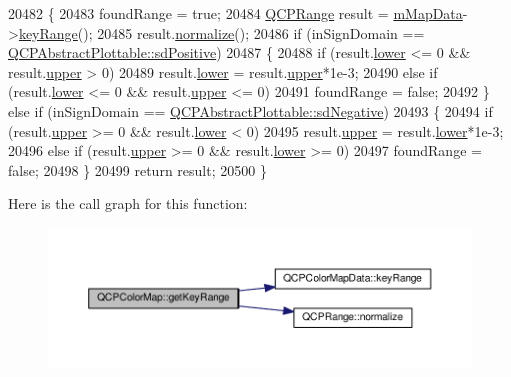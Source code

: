 \begin{DoxyCode}
20482 \{
20483   foundRange = \textcolor{keyword}{true};
20484   \hyperlink{class_q_c_p_range}{QCPRange} result = \hyperlink{class_q_c_p_color_map_a8709272aa8f0be3ca111bf3866806f8b}{mMapData}->\hyperlink{class_q_c_p_color_map_data_a4765180639742460f64ab6c97c745c08}{keyRange}();
20485   result.\hyperlink{class_q_c_p_range_af914a7740269b0604d0827c634a878a9}{normalize}();
20486   \textcolor{keywordflow}{if} (inSignDomain == \hyperlink{class_q_c_p_abstract_plottable_a661743478a1d3c09d28ec2711d7653d8a02951859f243a4d24e779cfbb5471030}{QCPAbstractPlottable::sdPositive})
20487   \{
20488     \textcolor{keywordflow}{if} (result.\hyperlink{class_q_c_p_range_aa3aca3edb14f7ca0c85d912647b91745}{lower} <= 0 && result.\hyperlink{class_q_c_p_range_ae44eb3aafe1d0e2ed34b499b6d2e074f}{upper} > 0)
20489       result.\hyperlink{class_q_c_p_range_aa3aca3edb14f7ca0c85d912647b91745}{lower} = result.\hyperlink{class_q_c_p_range_ae44eb3aafe1d0e2ed34b499b6d2e074f}{upper}*1e-3;
20490     \textcolor{keywordflow}{else} \textcolor{keywordflow}{if} (result.\hyperlink{class_q_c_p_range_aa3aca3edb14f7ca0c85d912647b91745}{lower} <= 0 && result.\hyperlink{class_q_c_p_range_ae44eb3aafe1d0e2ed34b499b6d2e074f}{upper} <= 0)
20491       foundRange = \textcolor{keyword}{false};
20492   \} \textcolor{keywordflow}{else} \textcolor{keywordflow}{if} (inSignDomain == \hyperlink{class_q_c_p_abstract_plottable_a661743478a1d3c09d28ec2711d7653d8a0fc9a70796ef60ad18ddd18056e6dc63}{QCPAbstractPlottable::sdNegative})
20493   \{
20494     \textcolor{keywordflow}{if} (result.\hyperlink{class_q_c_p_range_ae44eb3aafe1d0e2ed34b499b6d2e074f}{upper} >= 0 && result.\hyperlink{class_q_c_p_range_aa3aca3edb14f7ca0c85d912647b91745}{lower} < 0)
20495       result.\hyperlink{class_q_c_p_range_ae44eb3aafe1d0e2ed34b499b6d2e074f}{upper} = result.\hyperlink{class_q_c_p_range_aa3aca3edb14f7ca0c85d912647b91745}{lower}*1e-3;
20496     \textcolor{keywordflow}{else} \textcolor{keywordflow}{if} (result.\hyperlink{class_q_c_p_range_ae44eb3aafe1d0e2ed34b499b6d2e074f}{upper} >= 0 && result.\hyperlink{class_q_c_p_range_aa3aca3edb14f7ca0c85d912647b91745}{lower} >= 0)
20497       foundRange = \textcolor{keyword}{false};
20498   \}
20499   \textcolor{keywordflow}{return} result;
20500 \}
\end{DoxyCode}


Here is the call graph for this function\+:\nopagebreak
\begin{figure}[H]
\begin{center}
\leavevmode
\includegraphics[width=350pt]{class_q_c_p_color_map_a0d89371f8707f12e22737b863f1a5126_cgraph}
\end{center}
\end{figure}


